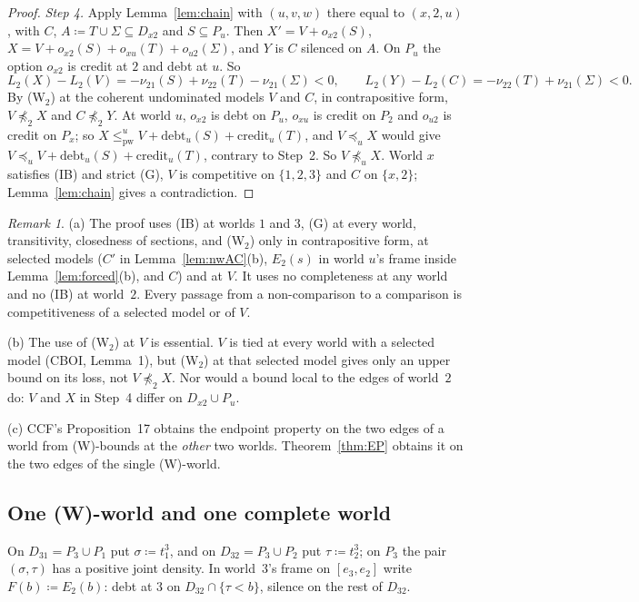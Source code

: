 \documentclass[11pt]{article}
\theoremstyle{definition}\newtheorem{definition}[theorem]{Definition}
\theoremstyle{remark}\newtheorem{remark}[theorem]{Remark}
\newcommand{\debt}{\mathrm{debt}}
\newcommand{\cred}{\mathrm{credit}}
\newcommand{\pw}{\mathrm{pw}}
\begin{document}
\begin{proof}
\emph{Step 4.} Apply Lemma~\ref{lem:chain} with $(u,v,w)$ there equal to
$(x,2,u)$, with $C$, $A\coloneqq T\cup\Sigma\subseteq D_{x2}$ and
$S\subseteq P_u$. Then $X'=V+o_{x2}(S)$,
$X=V+o_{x2}(S)+o_{xu}(T)+o_{u2}(\Sigma)$, and $Y$ is $C$ silenced on $A$.
On $P_u$ the option $o_{x2}$ is credit at $2$ and debt at $u$. So
\[
 L_2(X)-L_2(V)=-\nu_{21}(S)+\nu_{22}(T)-\nu_{21}(\Sigma)<0,\qquad
 L_2(Y)-L_2(C)=-\nu_{22}(T)+\nu_{21}(\Sigma)<0.
\]
By (W$_2$) at the coherent undominated models $V$ and $C$, in contrapositive
form, $V\not\preceq_2X$ and $C\not\preceq_2Y$. At world $u$, $o_{x2}$ is
debt on $P_u$, $o_{xu}$ is credit on $P_2$ and $o_{u2}$ is credit on $P_x$;
so $X\le^u_\pw V+\debt_u(S)+\cred_u(T)$, and $V\preceq_uX$ would give
$V\preceq_uV+\debt_u(S)+\cred_u(T)$, contrary to Step~2. So
$V\not\preceq_uX$. World $x$ satisfies (IB) and strict (G), $V$ is
competitive on $\{1,2,3\}$ and $C$ on $\{x,2\}$; Lemma~\ref{lem:chain} gives
a contradiction.
\end{proof}

\begin{remark}\label{rem:EP}
(a) The proof uses (IB) at worlds $1$ and $3$, (G) at every world,
transitivity, closedness of sections, and (W$_2$) only in contrapositive
form, at selected models ($C'$ in Lemma~\ref{lem:nwAC}(b), $E_2(s)$ in
world $u$'s frame inside Lemma~\ref{lem:forced}(b), and $C$) and at $V$. It
uses no completeness at any world and no (IB) at world~$2$. Every passage
from a non-comparison to a comparison is competitiveness of a selected
model or of $V$.

(b) The use of (W$_2$) at $V$ is essential. $V$ is tied at every world with
a selected model (CBOI, Lemma~1), but (W$_2$) at that selected model gives
only an upper bound on its loss, not $V\not\preceq_2X$. Nor would a bound
local to the edges of world~$2$ do: $V$ and $X$ in Step~4 differ on
$D_{x2}\cup P_u$.

(c) CCF's Proposition~17 obtains the endpoint property on the two edges of
a world from (W)-bounds at the \emph{other} two worlds. Theorem~\ref{thm:EP}
obtains it on the two edges of the single (W)-world.
\end{remark}

\subsection{One (W)-world and one complete world}\label{sec:onecomplete}

On $D_{31}=P_3\cup P_1$ put $\sigma\coloneqq t^3_1$, and on
$D_{32}=P_3\cup P_2$ put $\tau\coloneqq t^3_2$; on $P_3$ the pair
$(\sigma,\tau)$ has a positive joint density. In world~$3$'s frame on
$[e_3,e_2]$ write $F(b)\coloneqq E_2(b)$: debt at $3$ on
$D_{32}\cap\{\tau<b\}$, silence on the rest of $D_{32}$.
\end{document}
